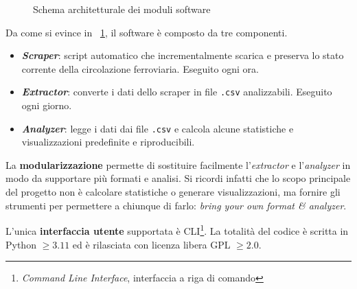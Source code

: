 \documentclass[12pt,a4paper,italian]{report}
\begin{document}
\begin{figure}[h]
    \caption{Schema architetturale dei moduli software}
    \label{figure:architettura}
\end{figure}

Da come si evince in \figurename~\ref{figure:architettura}, il
software è composto da tre componenti.
\begin{itemize}
    \item \textbf{\textit{Scraper}}: script automatico che
    incrementalmente scarica e preserva lo stato corrente della
    circolazione ferroviaria.  Eseguito ogni ora.
    \item \textbf{\textit{Extractor}}: converte i dati dello scraper
    in file \texttt{.csv} analizzabili.  Eseguito ogni giorno.
    \item \textbf{\textit{Analyzer}}: legge i dati dai file
    \texttt{.csv} e calcola alcune statistiche e visualizzazioni
    predefinite e riproducibili.
\end{itemize}

La \textbf{modularizzazione} permette di sostituire facilmente
l'\textit{extractor} e l'\textit{analyzer} in modo da supportare più
formati e analisi.  Si ricordi infatti che lo scopo principale del
progetto non è calcolare statistiche o generare visualizzazioni, ma
fornire gli strumenti per permettere a chiunque di farlo:
\textit{bring your own format \& analyzer}.

L'unica \textbf{interfaccia utente} supportata è
CLI\footnote{\textit{Command Line Interface}, interfaccia a riga di
    comando}.  La totalità del codice è scritta in Python $\geq 3.11$
ed è rilasciata con licenza libera GPL $\geq 2.0$.
\end{document}
